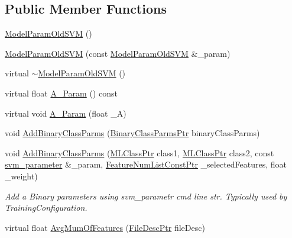 \subsection*{Public Member Functions}
\begin{DoxyCompactItemize}
\item 
\hyperlink{class_k_k_m_l_l_1_1_model_param_old_s_v_m_a9d2014a55cabd7a0c7c2c57e401e89ff}{Model\+Param\+Old\+S\+VM} ()
\item 
\hyperlink{class_k_k_m_l_l_1_1_model_param_old_s_v_m_aabcbf29a3165098ba7ce6b4c1f9fee03}{Model\+Param\+Old\+S\+VM} (const \hyperlink{class_k_k_m_l_l_1_1_model_param_old_s_v_m}{Model\+Param\+Old\+S\+VM} \&\+\_\+param)
\item 
virtual \hyperlink{class_k_k_m_l_l_1_1_model_param_old_s_v_m_a8496ead0041282041b90f783faeaac72}{$\sim$\+Model\+Param\+Old\+S\+VM} ()
\item 
virtual float \hyperlink{class_k_k_m_l_l_1_1_model_param_old_s_v_m_a4c4510bddd8e15144bad3bb0eeefacfc}{A\+\_\+\+Param} () const 
\item 
virtual void \hyperlink{class_k_k_m_l_l_1_1_model_param_old_s_v_m_af4b55e1e7db049337984254e45ab6afe}{A\+\_\+\+Param} (float \+\_\+A)
\item 
void \hyperlink{class_k_k_m_l_l_1_1_model_param_old_s_v_m_a93dc32eb64040c3f644a86f1a225bcac}{Add\+Binary\+Class\+Parms} (\hyperlink{namespace_k_k_m_l_l_aca399c0744e11553270ffaca507cfee7}{Binary\+Class\+Parms\+Ptr} binary\+Class\+Parms)
\item 
void \hyperlink{class_k_k_m_l_l_1_1_model_param_old_s_v_m_afbad1516f84b688408402ab0fbcf95c1}{Add\+Binary\+Class\+Parms} (\hyperlink{namespace_k_k_m_l_l_ac272393853d59e72e8456f14cd6d8c23}{M\+L\+Class\+Ptr} class1, \hyperlink{namespace_k_k_m_l_l_ac272393853d59e72e8456f14cd6d8c23}{M\+L\+Class\+Ptr} class2, const \hyperlink{class_k_k_m_l_l_1_1_model_param_old_s_v_m_ae96c3ff03f4145985df9225fdea5aa54}{svm\+\_\+parameter} \&\+\_\+param, \hyperlink{namespace_k_k_m_l_l_a81284b0a14973267260023f9a72da94a}{Feature\+Num\+List\+Const\+Ptr} \+\_\+selected\+Features, float \+\_\+weight)
\begin{DoxyCompactList}\small\item\em Add a Binary parameters using svm\+\_\+parametr cmd line str. Typically used by Training\+Configuration. \end{DoxyCompactList}\item 
virtual float \hyperlink{class_k_k_m_l_l_1_1_model_param_old_s_v_m_a41d02854ccd58baac192b408b53c75f7}{Avg\+Mum\+Of\+Features} (\hyperlink{namespace_k_k_m_l_l_aa0d0b6ab4ec18868a399b8455b05d914}{File\+Desc\+Ptr} file\+Desc)

\end{DoxyCompactItemize}
